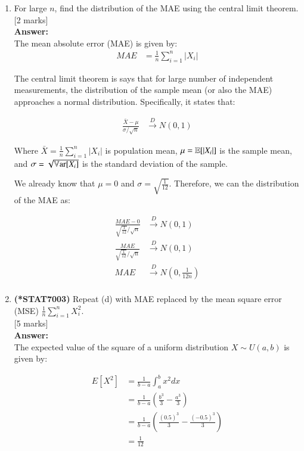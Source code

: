 \documentclass[12pt]{article}
\begin{document}
\begin{enumerate}
\begin{enumerate}
\item For large $n$, find the distribution of the MAE using the central limit theorem. 
			\hfill [2 marks]
%
\\
\textbf{Answer:}
\\
The mean absolute error (MAE) is given by:
\begin{align*}
MAE &= \frac{1}{n} \sum_{i=1}^n |X_i|
\end{align*}

The central limit theorem is says that for large number of independent measurements, the distribution of the sample mean (or also the MAE) approaches a normal distribution. Specifically, it states that:

\begin{align*}
\frac{\bar{X} - \mu}{\sigma/\sqrt{n}} &\xrightarrow{D} N(0, 1)
\end{align*}

Where $\bar{X} = \frac{1}{n} \sum_{i=1}^n |X_i|$ is population mean, $\mu = {\mathbb E}[|X_i|]$ is the sample mean, and $\sigma = \sqrt{\mathbb{V}\mathrm{ar}[X_i]}$ is the standard deviation of the sample.

We already know that $\mu = 0$ and $\sigma = \sqrt{\frac{1}{12}}$. Therefore, we can the distribution of the MAE as:

\begin{align*}
\frac{MAE - 0}{\sqrt{\frac{1}{12}}/\sqrt{n}} &\xrightarrow{D} N(0, 1) \\
\frac{MAE}{\sqrt{\frac{1}{12}}/\sqrt{n}} &\xrightarrow{D} N(0, 1) \\
MAE &\xrightarrow{D} N\left(0, \frac{1}{12n}\right) \\
\end{align*}
%

\item 
{\bf (*STAT7003)} Repeat (d) with MAE replaced by the mean square error (MSE) $\frac{1}{n} \sum_{i=1}^n X_i^2$. 
			\\\phantom{1}\hfill [5 marks]
%
\\
\textbf{Answer:}
\\
The expected value of the square of a uniform distribution $X \sim U(a, b)$ is given by:

\begin{align*}
E[X^2] &= \frac{1}{b-a} \int_a^b x^2 dx \\
&= \frac{1}{b-a} \left(\frac{b^3}{3} - \frac{a^3}{3}\right) \\
&= \frac{1}{b-a} \left(\frac{(0.5)^3}{3} - \frac{(-0.5)^3}{3}\right) \\
&= \frac{1}{12} \\
\end{align*}


\end{enumerate}
\end{enumerate}
\end{document}
